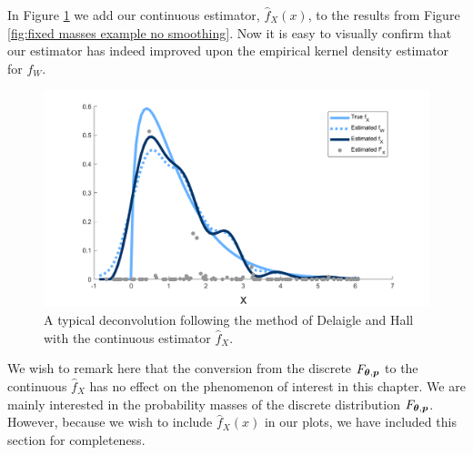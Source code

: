 
	In Figure \ref{fig:fixed masses example alone} we add our continuous estimator, $\hat{f}_X(x)$, to the results from Figure \ref{fig:fixed masses example no smoothing}. Now it is easy to visually confirm that our estimator has indeed improved upon the empirical kernel density estimator for $f_W$.

	\begin{figure}
		\centering
		\includegraphics[width = \textwidth]{Figures/Deconvolution/fixed_masses_example.png}
		\caption{A typical deconvolution following the method of Delaigle and Hall \cite{Delaigle2016-la} with the continuous estimator $\hat{f}_X$.}
		\label{fig:fixed masses example alone}
	\end{figure}

	We wish to remark here that the conversion from the discrete $F_{{\bm{{\theta}}}, {\bm{{p}}}}$ to the continuous $\hat{f}_X$ has no effect on the phenomenon of interest in this chapter. We are mainly interested in the probability masses of the discrete distribution $F_{{\bm{{\theta}}}, {\bm{{p}}}}$. However, because we wish to include $\hat{f}_X(x)$ in our plots, we have included this section for completeness.

	





